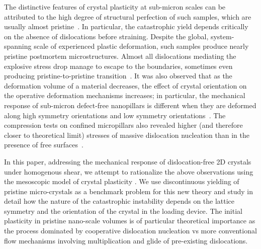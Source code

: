 \documentclass[CRPHYS,Unicode,manuscript]{cedram}
\begin{document}

The distinctive  features of crystal plasticity at sub-micron scales can be attributed to the high degree of structural perfection of such samples, which are usually almost pristine~\cite{He2016-bi,Merabet2018-cv}. In particular, the catastrophic yield depends critically on the absence of dislocations before straining. Despite the global, system-spanning scale of experienced plastic deformation, such  samples produce nearly pristine postmortem microstructures. Almost all dislocations mediating the explosive stress drop manage to escape to the boundaries, sometimes even producing pristine-to-pristine transition~\cite{wang2012pristine,Chisholm2012-ki}. It was also observed that as the deformation volume of a material decreases, the effect of crystal orientation on the operative deformation mechanisms increases; in particular, the mechanical response of sub-micron defect-free nanopillars is different when they are deformed along high symmetry orientations and low symmetry orientations~\cite{Ziegenhain2010-tu,Bagheripoor2020-qm}. The compression tests on confined micropillars also revealed  higher (and therefore closer to theoretical limit)  stresses of massive dislocation nucleation than in the presence of free surfaces~\cite{Bagheripoor2020-qm,Bagheripoor2020-gs}. 

In this paper, addressing  the mechanical response of   dislocation-free  2D crystals under homogenous shear, we attempt to rationalize the above  
observations  using the  mesoscopic model of crystal plasticity \cite{Salman2011-ij,Salman2012-oa,Baggio2019-rs}.  
  We use  discontinuous yielding of pristine micro-crystals as a benchmark problem for this new theory and  study in detail how  the nature of the catastrophic instability depends  on  the    lattice symmetry  and the  orientation of the crystal in the loading device. The initial plasticity in pristine nano-scale volumes is of particular theoretical importance as the process dominated by cooperative dislocation nucleation vs more conventional flow mechanisms involving   multiplication and glide  of pre-existing dislocations.
  
\end{document}
